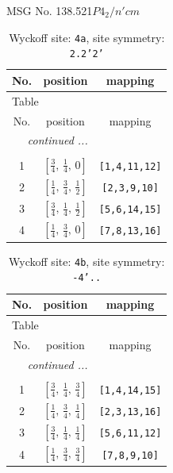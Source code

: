 \documentclass[fleqn,8pt]{jsarticle}
\begin{document}
\setcounter{MaxMatrixCols}{32}

\renewcommand{\tablename}{Table~}
\renewcommand{\figurename}{Figure~}
\begin{center}
\LARGE
MSG No. 138.521\quad$P4_{2}/n'cm$
\end{center}
\renewcommand{\arraystretch}{1.2}
\begin{longtable}{ccc}
\caption{Wyckoff site: {\tt 4a}, site symmetry: {\tt 2.2'2'}}
 \\
 \hline \hline
No. & position & mapping \\ \hline \endfirsthead

\multicolumn{2}{l}{\tablename\ \thetable{}} \\
 \hline \hline
No. & position & mapping \\ \hline \endhead

 \hline \hline
\multicolumn{2}{r}{\footnotesize\it continued ...} \\ \endfoot

 \hline \hline
\multicolumn{2}{r}{} \\ \endlastfoot

1 & $\left[ \frac{3}{4},\, \frac{1}{4},\, 0 \right]$ & {\tt [1,4,11,12]} \\ \hline
2 & $\left[ \frac{1}{4},\, \frac{3}{4},\, \frac{1}{2} \right]$ & {\tt [2,3,9,10]} \\ \hline
3 & $\left[ \frac{3}{4},\, \frac{1}{4},\, \frac{1}{2} \right]$ & {\tt [5,6,14,15]} \\ \hline
4 & $\left[ \frac{1}{4},\, \frac{3}{4},\, 0 \right]$ & {\tt [7,8,13,16]} \\
\end{longtable}
\renewcommand{\arraystretch}{1.2}
\begin{longtable}{ccc}
\caption{Wyckoff site: {\tt 4b}, site symmetry: {\tt -4'..}}
 \\
 \hline \hline
No. & position & mapping \\ \hline \endfirsthead

\multicolumn{2}{l}{\tablename\ \thetable{}} \\
 \hline \hline
No. & position & mapping \\ \hline \endhead

 \hline \hline
\multicolumn{2}{r}{\footnotesize\it continued ...} \\ \endfoot

 \hline \hline
\multicolumn{2}{r}{} \\ \endlastfoot

1 & $\left[ \frac{3}{4},\, \frac{1}{4},\, \frac{3}{4} \right]$ & {\tt [1,4,14,15]} \\ \hline
2 & $\left[ \frac{1}{4},\, \frac{3}{4},\, \frac{1}{4} \right]$ & {\tt [2,3,13,16]} \\ \hline
3 & $\left[ \frac{3}{4},\, \frac{1}{4},\, \frac{1}{4} \right]$ & {\tt [5,6,11,12]} \\ \hline
4 & $\left[ \frac{1}{4},\, \frac{3}{4},\, \frac{3}{4} \right]$ & {\tt [7,8,9,10]} \\
\end{longtable}
\end{document}
